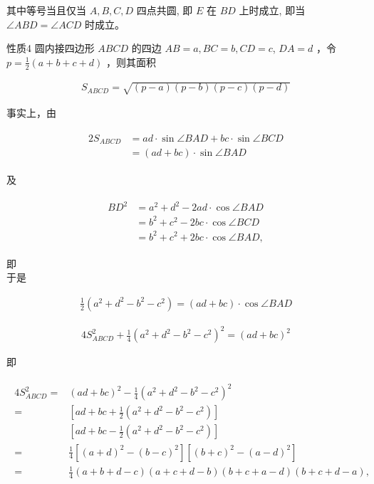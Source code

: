 \documentclass[10pt]{article}
\begin{document}
其中等号当且仅当 $A, B, C, D$ 四点共圆, 即 $E$ 在 $B D$ 上时成立, 即当 $\angle A B D=\angle A C D$ 时成立。

性质4 圆内接四边形 $A B C D$ 的四边 $A B=a, B C=b, C D=c$, $D A=d$ ，令 $p=\frac{1}{2}(a+b+c+d)$ ，则其面积

\begin{align*}
S_{A B C D}=\sqrt{(p-a)(p-b)(p-c)(p-d)}
\end{align*}

事实上，由

\begin{align*}
\begin{aligned}
2 S_{A B C D} & =a d \cdot \sin \angle B A D+b c \cdot \sin \angle B C D \\
& =(a d+b c) \cdot \sin \angle B A D
\end{aligned}
\end{align*}

及

\begin{align*}
\begin{aligned}
B D^{2} & =a^{2}+d^{2}-2 a d \cdot \cos \angle B A D \\
& =b^{2}+c^{2}-2 b c \cdot \cos \angle B C D \\
& =b^{2}+c^{2}+2 b c \cdot \cos \angle B A D,
\end{aligned}
\end{align*}

即\\
于是

\begin{align*}
\frac{1}{2}\left(a^{2}+d^{2}-b^{2}-c^{2}\right)=(a d+b c) \cdot \cos \angle B A D
\end{align*}

\begin{align*}
4 S_{A B C D}^{2}+\frac{1}{4}\left(a^{2}+d^{2}-b^{2}-c^{2}\right)^{2}=(a d+b c)^{2}
\end{align*}

即

\begin{align*}
\begin{aligned}
4 S_{A B C D}^{2}= & (a d+b c)^{2}-\frac{1}{4}\left(a^{2}+d^{2}-b^{2}-c^{2}\right)^{2} \\
= & {\left[a d+b c+\frac{1}{2}\left(a^{2}+d^{2}-b^{2}-c^{2}\right)\right] } \\
& {\left[a d+b c-\frac{1}{2}\left(a^{2}+d^{2}-b^{2}-c^{2}\right)\right] } \\
= & \frac{1}{4}\left[(a+d)^{2}-(b-c)^{2}\right]\left[(b+c)^{2}-(a-d)^{2}\right] \\
= & \frac{1}{4}(a+b+d-c)(a+c+d-b)(b+c+a-d)(b+c+d-a),
\end{aligned}
\end{align*}
\end{document}
